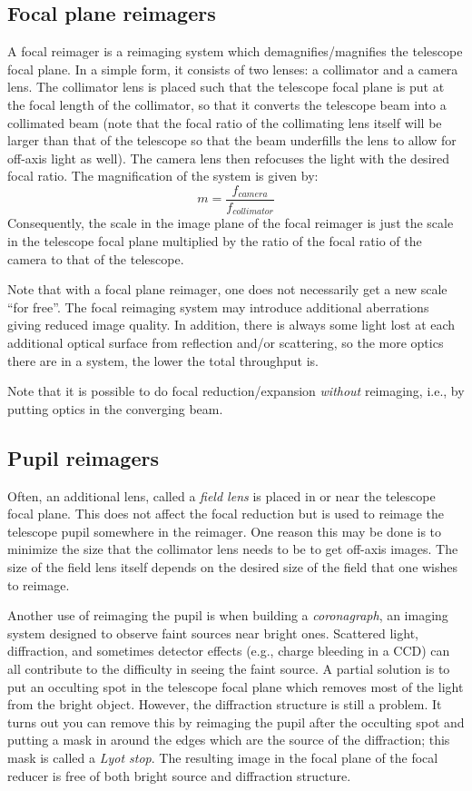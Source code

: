 \documentclass[12pt]{article}
\begin{document}
\subsection{Focal plane reimagers}
A focal reimager is a reimaging system which demagnifies/magnifies the
telescope focal plane. In a simple form, it consists of two lenses: a
collimator and a camera lens. The collimator lens is placed such that
the telescope focal plane is put at the focal length of the
collimator, so that it converts the telescope beam into a collimated
beam (note that the focal ratio of the collimating lens itself will be
larger than that of the telescope so that the beam underfills the lens
to allow for off-axis light as well). The camera lens then refocuses
the light with the desired focal ratio. The magnification of the
system is given by:{$$
    m = \frac{f_{camera}}{f_{collimator}}
$$}Consequently, the scale in the image plane of the focal reimager is
just the scale in the telescope focal plane multiplied by the ratio of
the focal ratio of the camera to that of the telescope.

Note that with a focal plane reimager, one does not necessarily get a
new scale ``for free''. The focal reimaging system may introduce
additional aberrations giving reduced image quality. In addition,
there is always some light lost at each additional optical surface from
reflection and/or scattering, so the more optics there are in a system,
the lower the total throughput is.

Note that it is possible to do focal reduction/expansion
\emph{without} reimaging, i.e., by putting optics in the converging beam.

\subsection{Pupil reimagers}
Often, an additional lens, called a \emph{field lens} is placed in or near
the telescope focal plane. This does not affect the focal reduction
but is used to reimage the telescope pupil somewhere in the reimager.
One reason this may be done is to minimize the size that the
collimator lens needs to be to get off-axis images. The size of the
field lens itself depends on the desired size of the field that one
wishes to reimage.

Another use of reimaging the pupil is when building a
\emph{coronagraph}, an imaging system designed to observe faint sources
near bright ones. Scattered light, diffraction, and sometimes detector effects
(e.g., charge bleeding in a CCD)
can all contribute to the difficulty in seeing the
faint source. A partial solution is to put an occulting spot in
the telescope focal plane which removes most of the light from the
bright object. However, the diffraction structure is still a problem.
It turns out you can remove this by reimaging the pupil after the
occulting spot and putting a mask in around the edges which are the
source of the diffraction; this mask is called a \emph{Lyot stop}.
The resulting image in the focal plane of the focal reducer is free of
both bright source and diffraction structure.
\end{document}
